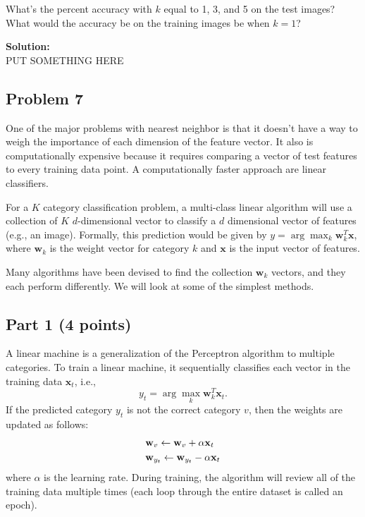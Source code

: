 \documentclass[11pt, oneside]{article}   	%
\begin{document}
What's the percent accuracy with $k$ equal to 1, 3, and 5 on the test images? What would the accuracy be on the training images be when $k=1$?
 
\textbf{Solution:}\\
PUT SOMETHING HERE 

\subsection*{Problem 7}

One of the major problems with nearest neighbor is that it doesn't have a way to weigh the importance of each dimension of the feature vector. It also is computationally expensive because it requires comparing a vector of test features to every training data point. A computationally faster approach are linear classifiers.

For a $K$ category classification problem, a multi-class linear algorithm will use a collection of $K$ $d$-dimensional vector to classify a $d$ dimensional vector of features (e.g., an image). Formally, this prediction would be given by 
$y = \arg \max _k {\mathbf{w}}_k^T {\mathbf{x}}$, where $\mathbf{w}_k$ is the weight vector for category $k$ and ${\mathbf{x}}$ is the input vector of features.

Many algorithms have been devised to find the collection $\mathbf{w}_k$ vectors, and they each perform differently. We will look at some of the simplest methods.


\subsection*{Part 1 (4 points)}
A linear machine is a generalization of the Perceptron algorithm to multiple categories. To train a linear machine, it sequentially classifies each vector in the training data ${\mathbf{x}}_t$, i.e.,
\[
y_t  = \arg \max _k {\mathbf{w}}_k^{T} {\mathbf{x}}_t. 
\]
If the predicted category $y_t$ is not the correct category $v$, then the weights are updated as follows:
\[
\begin{gathered}
  {\mathbf{w}}_v   \leftarrow  {\mathbf{w}}_v  + \alpha {\mathbf{x}}_t  \hfill \\
  {\mathbf{w}}_{y_t }   \leftarrow  {\mathbf{w}}_{y_t }  - \alpha {\mathbf{x}}_t  \hfill \\ 
\end{gathered} 
\]
where $\alpha$ is the learning rate. During training, the algorithm will review all of the training data multiple times (each loop through the entire dataset is called an epoch).
\end{document}

